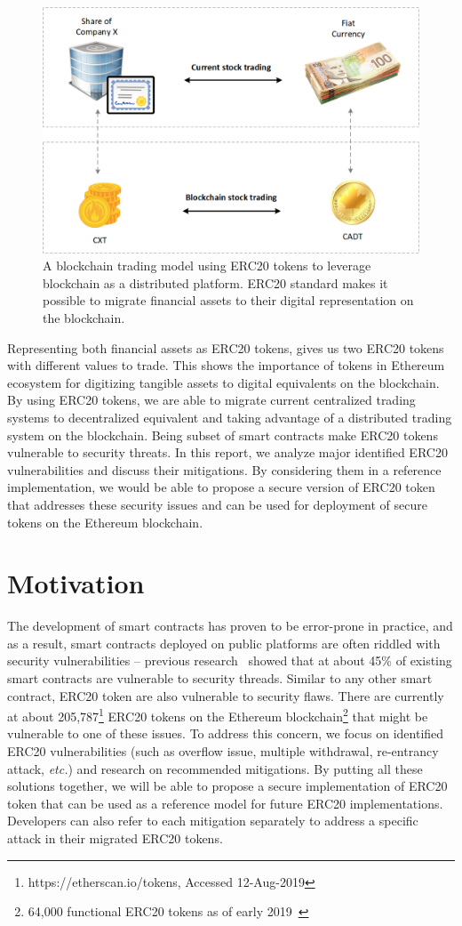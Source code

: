 \begin{figure}[t]
	\centering
	\includegraphics[width=0.78\linewidth]{figures/img01.png}
	\caption{A blockchain trading model using ERC20 tokens to leverage blockchain as a distributed platform. ERC20 standard makes it possible to migrate financial assets to their digital representation on the blockchain.}
	\label{fig:erc20ex}
\end{figure}

Representing both financial assets as ERC20 tokens, gives us two ERC20 tokens with different values to trade. This shows the importance of tokens in Ethereum ecosystem for digitizing tangible assets to digital equivalents on the blockchain. By using ERC20 tokens, we are able to migrate current centralized trading systems to decentralized equivalent and taking advantage of a distributed trading system on the blockchain. Being subset of smart contracts make ERC20 tokens vulnerable to security threats. In this report, we analyze major identified ERC20 vulnerabilities and discuss their mitigations. By considering them in a reference implementation, we would be able to propose a secure version of ERC20 token that addresses these security issues and can be used for deployment of secure tokens on the Ethereum blockchain.

\section{Motivation}
The development of smart contracts has proven to be error-prone in practice, and as a result, smart contracts deployed on public platforms are often riddled with security vulnerabilities -- previous research~\cite{MakSm} showed that at about 45\% of existing smart contracts are vulnerable to security threads. Similar to any other smart contract, ERC20 token are also vulnerable to security flaws. There are currently at about 205,787\footnote{https://etherscan.io/tokens, Accessed 12-Aug-2019} ERC20 tokens on the Ethereum blockchain\footnote{64,000 functional ERC20 tokens as of early 2019~\cite{victormeasuring}} that might be vulnerable to one of these issues.  To address this concern, we focus on identified ERC20 vulnerabilities (such as overflow issue, multiple withdrawal, re-entrancy attack, \textit{etc.}) and research on recommended mitigations. By putting all these solutions together, we will be able to propose a secure implementation of ERC20 token that can be used as a reference model for future ERC20 implementations. Developers can also refer to each mitigation separately to address a specific attack in their migrated ERC20 tokens.

